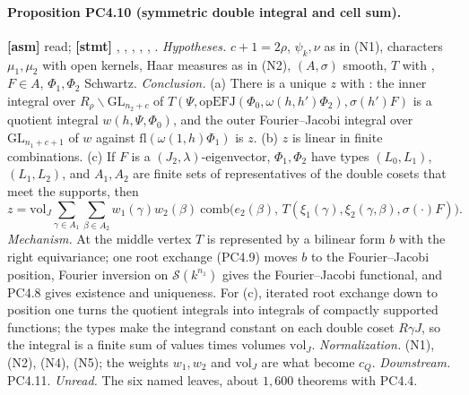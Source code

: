 \documentclass[11pt]{article}
\newcommand{\GL}{\mathrm{GL}}
\newcommand{\Sch}{\mathcal S}
\begin{document}
\paragraph{Proposition PC4.10 (symmetric double integral and cell sum).} \textbf{[asm]}  read; \textbf{[stmt]} , , , , , .
\emph{Hypotheses.} $c+1=2\rho$, $\psi_k,\nu$ as in (N1), characters $\mu_1,\mu_2$ with open kernels, Haar measures as in (N2), $(A,\sigma)$ smooth, $T$ with , $F\in A$, $\Phi_1,\Phi_2$ Schwartz. \emph{Conclusion.} (a) There is a unique $z$ with : the inner integral over $R_\rho\backslash\GL_{n_2+c}$ of $T(\Psi,\mathrm{opEFJ}(\Phi_0,\omega(h,h')\Phi_2),\sigma(h')F)$ is a quotient integral $w(h,\Psi,\Phi_0)$, and the outer Fourier--Jacobi integral over $\GL_{n_1+c+1}$ of $w$ against $\mathrm{fl}(\omega(1,h)\Phi_1)$ is $z$. (b) $z$ is linear in finite combinations. (c) If $F$ is a $(J_2,\lambda)$-eigenvector, $\Phi_1,\Phi_2$ have types $(L_0,L_1)$, $(L_1,L_2)$, and $A_1,A_2$ are finite sets of representatives of the double cosets that meet the supports, then
\[
z=\mathrm{vol}_J\sum_{\gamma\in A_1}\sum_{\beta\in A_2}w_1(\gamma)w_2(\beta)\ \mathrm{comb}\bigl(e_2(\beta),\,T(\xi_1(\gamma),\xi_2(\gamma,\beta),\sigma(\cdot)F)\bigr).
\]
\emph{Mechanism.} At the middle vertex $T$ is represented by a bilinear form $b$ with the right equivariance; one root exchange (PC4.9) moves $b$ to the Fourier--Jacobi position, Fourier inversion on $\Sch(k^{n_1})$ gives the Fourier--Jacobi functional, and PC4.8 gives existence and uniqueness. For (c), iterated root exchange down to position one turns the quotient integrals into integrals of compactly supported functions; the types make the integrand constant on each double coset $R\gamma J$, so the integral is a finite sum of values times volumes $\mathrm{vol}_J$. \emph{Normalization.} (N1), (N2), (N4), (N5); the weights $w_1,w_2$ and $\mathrm{vol}_J$ are what become $c_Q$. \emph{Downstream.} PC4.11. \emph{Unread.} The six named leaves, about $1{,}600$ theorems with PC4.4.
\end{document}
